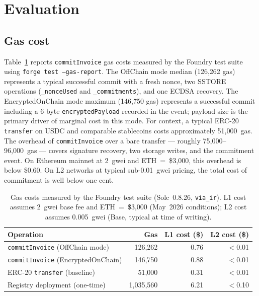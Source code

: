 \documentclass[11pt,a4paper]{article}
\begin{document}
\section{Evaluation}
\label{sec:eval}

\subsection{Gas cost}

Table~\ref{tab:gas} reports \texttt{commitInvoice} gas costs measured by the Foundry test suite using \texttt{forge test --gas-report}. The OffChain mode median (126{,}262 gas) represents a typical successful commit with a fresh nonce, two SSTORE operations (\texttt{\_nonceUsed} and \texttt{\_commitments}), and one ECDSA recovery. The EncryptedOnChain mode maximum (146{,}750 gas) represents a successful commit including a 6-byte \texttt{encryptedPayload} recorded in the event; payload size is the primary driver of marginal cost in this mode. For context, a typical ERC-20 \texttt{transfer} on USDC and comparable stablecoins costs approximately 51{,}000~gas. The overhead of \texttt{commitInvoice} over a bare transfer --- roughly 75{,}000--96{,}000~gas --- covers signature recovery, two storage writes, and the commitment event. On Ethereum mainnet at 2~gwei and ETH~=~\$3{,}000, this overhead is below \$0.60. On L2 networks at typical sub-0.01~gwei pricing, the total cost of commitment is well below one cent.

\begin{table}[h]
\centering
\caption{Gas costs measured by the Foundry test suite (Solc~0.8.26, \texttt{via\_ir}). L1 cost assumes 2~gwei base fee and ETH~=~\$3{,}000 (May~2026 conditions); L2 cost assumes 0.005~gwei (Base, typical at time of writing).}
\label{tab:gas}
\begin{tabular}{lrrr}
\toprule
Operation & Gas & L1 cost (\$) & L2 cost (\$) \\
\midrule
\texttt{commitInvoice} (OffChain mode)    & 126{,}262 & 0.76 & $<$0.01 \\
\texttt{commitInvoice} (EncryptedOnChain) & 146{,}750 & 0.88 & $<$0.01 \\
ERC-20 \texttt{transfer} (baseline)       &  51{,}000 & 0.31 & $<$0.01 \\
Registry deployment (one-time)            & 1{,}035{,}560 & 6.21 & $<$0.10 \\
\bottomrule
\end{tabular}
\end{table}
\end{document}
